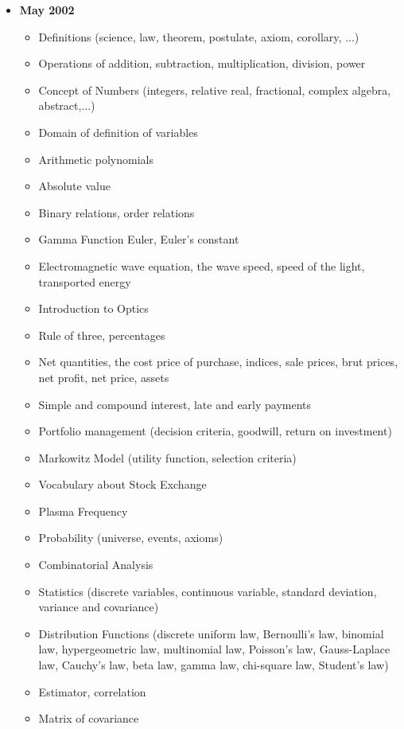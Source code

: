 \documentclass[12pt,a4paper,twoside,openright]{report}
\newcounter{def}
\theoremstyle{definition}
\theoremstyle{itexmp}
\numberwithin{equation}{section}
\begin{document}
	\begin{itemize}
		\item \textbf{May 2002}
			\begin{itemize}[noitemsep]
				\item Definitions (science, law, theorem, postulate, axiom, corollary, ...)
				\item Operations of addition, subtraction, multiplication, division, power
				\item Concept of Numbers (integers, relative real, fractional, complex algebra, abstract,...)
				\item Domain of definition of variables
				\item Arithmetic polynomials
				\item Absolute value
				\item Binary relations, order relations
				\item Gamma Function Euler, Euler's constant
				\item Electromagnetic wave equation, the wave speed, speed of the light, transported energy
				\item Introduction to Optics
				\item Rule of three, percentages
				\item Net quantities, the cost price of purchase, indices, sale prices, brut prices, net profit, net price, assets
				\item Simple and compound interest, late and early payments
				\item Portfolio management (decision criteria, goodwill, return on investment)
				\item Markowitz Model (utility function, selection criteria)
				\item Vocabulary about Stock Exchange
				\item Plasma Frequency
				\item Probability (universe, events, axioms)
				\item Combinatorial Analysis
				\item Statistics (discrete variables, continuous variable, standard deviation, variance and covariance)
				\item Distribution Functions (discrete uniform law, Bernoulli's law, binomial law, hypergeometric law, multinomial law, Poisson's law, Gauss-Laplace law, Cauchy's law, beta law, gamma law, chi-square law, Student's law)
				\item Estimator, correlation
				\item Matrix of covariance

\end{itemize}
\end{itemize}
\end{document}
